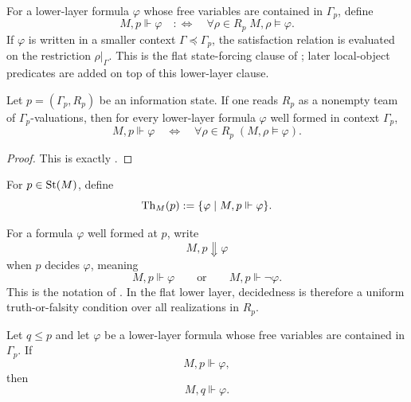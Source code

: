 \begin{definition}\label{def:state-forcing}
For a lower-layer formula $\varphi$ whose free variables are contained in
$\Gamma_p$, define
\[
M,p\Vdash\varphi
\quad:\Longleftrightarrow\quad
\forall \rho\in R_p\; M,\rho\models\varphi .
\]
If $\varphi$ is written in a smaller context $\Gamma\preceq\Gamma_p$, the
satisfaction relation is evaluated on the restriction $\rho|_\Gamma$. This is
the flat state-forcing clause of
\cite[Definition~3.3]{HomologicalVisibilityGluingObstructions2026}; later
local-object predicates are added on top of this lower-layer clause.
\end{definition}

\begin{proposition}\label{prop:flat-team-reading}
Let $p=(\Gamma_p,R_p)$ be an information state. If one reads $R_p$ as a nonempty team of $\Gamma_p$-valuations, then for every lower-layer formula $\varphi$ well formed in context $\Gamma_p$,
\[
M,p\Vdash\varphi
\quad\Longleftrightarrow\quad
\forall \rho\in R_p\;(M,\rho\models\varphi).
\]
\end{proposition}

\begin{proof}
This is exactly .
\end{proof}

\begin{definition}\label{def:state-theory}
For $p\in\mathrm{St}(M)$, define
\[
\mathrm{Th}_M(p):=\{\varphi\mid M,p\Vdash\varphi\}.
\]
\end{definition}

\begin{definition}[Decidedness]\label{def:decidedness}
For a formula $\varphi$ well formed at $p$, write
\[
M,p\Downarrow\varphi
\]
when $p$ decides $\varphi$, meaning
\[
M,p\Vdash\varphi
\qquad\text{or}\qquad
M,p\Vdash\neg\varphi .
\]
This is the notation of
\cite[Definition~3.5]{HomologicalVisibilityGluingObstructions2026}. In the
flat lower layer, decidedness is therefore a uniform truth-or-falsity condition
over all realizations in $R_p$.
\end{definition}

\begin{proposition}\label{prop:forcing-persistence}
Let $q\le p$ and let $\varphi$ be a lower-layer formula whose free variables
are contained in $\Gamma_p$. If
\[
M,p\Vdash\varphi,
\]
then
\[
M,q\Vdash\varphi .
\]
\end{proposition}

